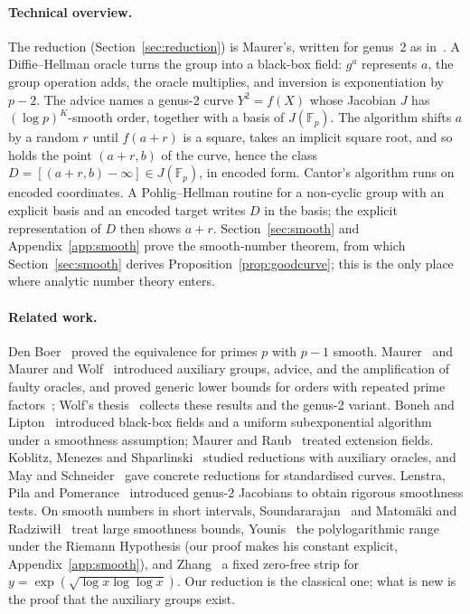 \documentclass[11pt]{article}
\theoremstyle{remark}
\newcommand{\F}{\mathbb{F}}
\begin{document}
\paragraph{Technical overview.}
The reduction (Section~\ref{sec:reduction}) is Maurer's, written for genus~2 as in~\cite{Wol99,KMS10}. A
Diffie--Hellman oracle turns the group into a black-box field: $g^a$ represents $a$, the group operation adds,
the oracle multiplies, and inversion is exponentiation by $p-2$. The advice names a genus-2 curve
$Y^2=f(X)$ whose Jacobian $J$ has $(\log p)^K$-smooth order, together with a basis of $J(\F_p)$. The
algorithm shifts $a$ by a random $r$ until $f(a+r)$ is a square, takes an implicit square root, and so holds
the point $(a+r,b)$ of the curve, hence the class $D=[(a+r,b)-\infty]\in J(\F_p)$, in encoded form. Cantor's
algorithm runs on encoded coordinates. A Pohlig--Hellman routine for a non-cyclic group with an explicit
basis and an encoded target writes $D$ in the basis; the explicit representation of $D$ then shows $a+r$.
Section~\ref{sec:smooth} and Appendix~\ref{app:smooth} prove the smooth-number theorem, from which
Section~\ref{sec:smooth} derives Proposition~\ref{prop:goodcurve}; this is the only place where analytic
number theory enters.

\paragraph{Related work.}
Den Boer~\cite{dB88} proved the equivalence for primes $p$ with $p-1$ smooth. Maurer~\cite{Mau94} and Maurer and
Wolf~\cite{MW96,MW99,MW00} introduced auxiliary groups, advice, and the amplification of faulty oracles, and
proved generic lower bounds for orders with repeated prime factors~\cite{MW98}; Wolf's thesis~\cite{Wol99}
collects these results and the genus-2 variant. Boneh and Lipton~\cite{BL96} introduced black-box fields and a
uniform subexponential algorithm under a smoothness assumption; Maurer and Raub~\cite{MR07} treated extension
fields. Koblitz, Menezes and Shparlinski~\cite{KMS10} studied reductions with auxiliary oracles, and May and
Schneider~\cite{MS23} gave concrete reductions for standardised curves. Lenstra, Pila and
Pomerance~\cite{LPP93,LPP02} introduced genus-2 Jacobians to obtain rigorous smoothness tests. On smooth numbers
in short intervals, Soundararajan~\cite{Sou10} and Matom\"aki and Radziwi\l\l~\cite{MR16} treat large smoothness
bounds, Younis~\cite{You24} the polylogarithmic range under the Riemann Hypothesis (our proof makes his
constant explicit, Appendix~\ref{app:smooth}), and Zhang~\cite{Zha26} a fixed zero-free strip for
$y=\exp(\sqrt{\log x\log\log x})$. Our reduction is the classical one; what is new is the proof that the
auxiliary groups exist.
\end{document}
